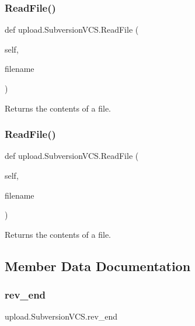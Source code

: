 \subsubsection{\texorpdfstring{ReadFile()}{ReadFile()}\hspace{0.1cm}{\footnotesize\ttfamily [1/2]}}
{\footnotesize\ttfamily def upload.\+Subversion\+V\+C\+S.\+Read\+File (\begin{DoxyParamCaption}\item[{}]{self,  }\item[{}]{filename }\end{DoxyParamCaption})}

\begin{DoxyVerb}Returns the contents of a file.\end{DoxyVerb}
 \mbox{\label{classupload_1_1_subversion_v_c_s_a340d269b74386ac863636f6b0683d9f4}} 
\subsubsection{\texorpdfstring{ReadFile()}{ReadFile()}\hspace{0.1cm}{\footnotesize\ttfamily [2/2]}}
{\footnotesize\ttfamily def upload.\+Subversion\+V\+C\+S.\+Read\+File (\begin{DoxyParamCaption}\item[{}]{self,  }\item[{}]{filename }\end{DoxyParamCaption})}

\begin{DoxyVerb}Returns the contents of a file.\end{DoxyVerb}
 

\subsection{Member Data Documentation}
\mbox{\label{classupload_1_1_subversion_v_c_s_ac0bb07a099c722b7f8622de4b225904f}} 
\subsubsection{\texorpdfstring{rev\_end}{rev\_end}}
{\footnotesize\ttfamily upload.\+Subversion\+V\+C\+S.\+rev\+\_\+end}

